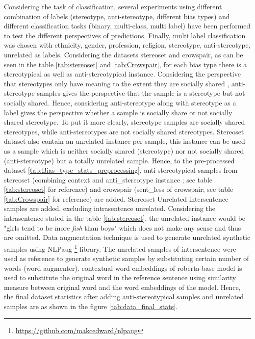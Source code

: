 Considering the task of classification, several experiments using different combination of labels (stereotype, anti-stereotype, different bias types) and different classification tasks (binary, multi-class, multi label) have been performed to test the different perspectives of predictions. Finally, multi label classification was chosen with ethnicity, gender, profession, religion, stereotype, anti-stereotype, unrelated as labels. Considering the datasets stereoset and crowspair, as can be seen in the table \ref{tab:stereoset} and \ref{tab:Crowspair}, for each bias type there is a stereotypical as well as anti-stereotypical instance. Considering the perspective that stereotypes only have meaning to the extent they are socially shared \cite{macrae1996stereotypes}, anti-stereotype samples gives the perspective that the sample is a stereotype but not socially shared. Hence, considering anti-stereotype along with stereotype as a label gives the perspective whether a sample is socially share or not socially shared stereotype. To put it more clearly, stereotype samples are socially shared stereotypes, while anti-stereotypes are not socially shared stereotypes. Stereoset dataset also contain an unrelated instance per sample, this instance can be used as a sample which is neither socially shared (stereotype) nor not socially shared (anti-stereotype) but a totally unrelated sample. Hence, to the pre-processed dataset \ref{tab:Bias_type_stats_preprocessing}, anti-stereotypical samples from stereoset (combining context and anti\_stereotype instance ; see table \ref{tab:stereoset} for reference) and crowspair (sent\_less of crowspair; see table \ref{tab:Crowspair} for reference) are added. Stereoset Unrelated intersentence samples are added, excluding intrasentence unrelated. Considering the intrasentence stated in the table \ref{tab:stereoset}, the unrelated instance would be "girls tend to be more \textit{fish} than boys" which does not make any sense and thus are omitted. Data augmentation technique is used to generate unrelated synthetic samples using NLPaug \footnote{\url{https://github.com/makcedward/nlpaug}} library. The unrelated samples of intersentence were used as reference to generate synthetic samples by substituting certain number of words (word augmenter). contextual word embeddings of roberta-base model is used to substitute the original word in the reference sentence using similarity measure between original word and the word embeddings of the model. Hence, the final dataset statistics after adding anti-stereotypical samples and unrelated samples are as shown in the figure \ref{tab:data_final_stats}.

